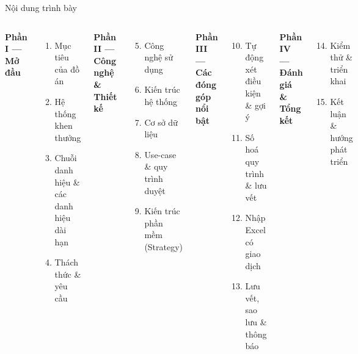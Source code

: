 \documentclass[aspectratio=43,xcolor=table]{beamer}
\begin{document}
\begin{frame}{Nội dung trình bày}
  \begin{columns}[T,onlytextwidth]
    \small
    \textcolor{hustdark}{\textbf{Phần I --- Mở đầu}}
    \begin{enumerate}
      \item Mục tiêu của đồ án
      \item Hệ thống khen thưởng
      \item Chuỗi danh hiệu \& các danh hiệu dài hạn
      \item Thách thức \& yêu cầu
    \end{enumerate}
    \vspace{0.05cm}
    \textcolor{hustdark}{\textbf{Phần II --- Công nghệ \& Thiết kế}}
    \begin{enumerate}\setcounter{enumi}{4}
      \item Công nghệ sử dụng
      \item Kiến trúc hệ thống
      \item Cơ sở dữ liệu
      \item Use-case \& quy trình duyệt
      \item Kiến trúc phần mềm (Strategy)
    \end{enumerate}

    \small
    \textcolor{hustdark}{\textbf{Phần III --- Các đóng góp nổi bật}}
    \begin{enumerate}\setcounter{enumi}{9}
      \item Tự động xét điều kiện \& gợi ý
      \item Số hoá quy trình \& lưu vết
      \item Nhập Excel có giao dịch
      \item Lưu vết, sao lưu \& thông báo
    \end{enumerate}
    \vspace{0.05cm}
    \textcolor{hustdark}{\textbf{Phần IV --- Đánh giá \& Tổng kết}}
    \begin{enumerate}\setcounter{enumi}{13}
      \item Kiểm thử \& triển khai
      \item Kết luận \& hướng phát triển
    \end{enumerate}
  \end{columns}
\end{frame}
\end{document}
